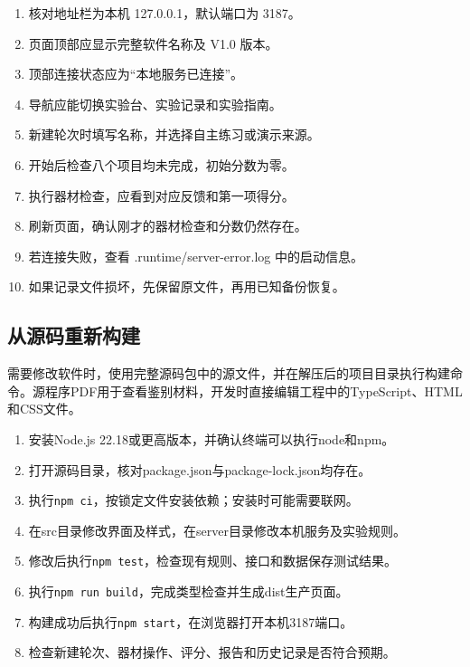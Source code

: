 \documentclass[UTF8,fontset=windows,zihao=-4]{ctexart}
\newcommand{\api}[1]{\nolinkurl{#1}}
\begin{document}
\begin{enumerate}

\item 核对地址栏为本机 127.0.0.1，默认端口为 3187。

\item 页面顶部应显示完整软件名称及 V1.0 版本。

\item 顶部连接状态应为“本地服务已连接”。

\item 导航应能切换实验台、实验记录和实验指南。

\item 新建轮次时填写名称，并选择自主练习或演示来源。

\item 开始后检查八个项目均未完成，初始分数为零。

\item 执行器材检查，应看到对应反馈和第一项得分。

\item 刷新页面，确认刚才的器材检查和分数仍然存在。

\item 若连接失败，查看 .runtime/server-error.log 中的启动信息。

\item 如果记录文件损坏，先保留原文件，再用已知备份恢复。

\end{enumerate}

\subsection{从源码重新构建}

需要修改软件时，使用完整源码包中的源文件，并在解压后的项目目录执行构建命令。源程序PDF用于查看鉴别材料，开发时直接编辑工程中的TypeScript、HTML和CSS文件。

\begin{enumerate}
\item 安装Node.js 22.18或更高版本，并确认终端可以执行node和npm。
\item 打开源码目录，核对package.json与package-lock.json均存在。
\item 执行\api{npm ci}，按锁定文件安装依赖；安装时可能需要联网。
\item 在src目录修改界面及样式，在server目录修改本机服务及实验规则。
\item 修改后执行\api{npm test}，检查现有规则、接口和数据保存测试结果。
\item 执行\api{npm run build}，完成类型检查并生成dist生产页面。
\item 构建成功后执行\api{npm start}，在浏览器打开本机3187端口。
\item 检查新建轮次、器材操作、评分、报告和历史记录是否符合预期。
\end{enumerate}
\end{document}
